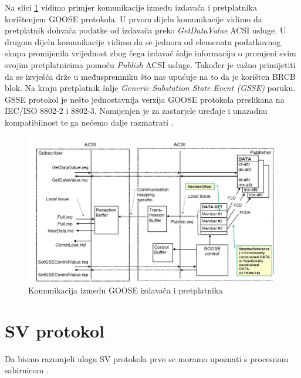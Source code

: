 \documentclass[times, utf8, zavrsni]{fer}
\begin{document}
Na slici \ref{fig:iec-goose-complex} vidimo primjer komunikacije između izdavača i pretplatnika korištenjem GOOSE protokola. U prvom dijelu komunikacije vidimo da pretplatnik dohvaća podatke od izdavača preko \textit{GetDataValue} ACSI usluge. U drugom dijelu komunikacije vidimo da se jednom od elemenata podatkovnog skupa promijenila vrijednost zbog čega izdavač šalje informaciju o promjeni svim svojim pretplatnicima pomoću \textit{Publish} ACSI usluge. Također je važno primijetiti da se izvješća drže u međuspremniku što nas upućuje na to da je korišten BRCB blok. Na kraju pretplatnik šalje \textit{Generic Substation State Event (GSSE)} poruku. GSSE protokol je nešto jednostavnija verzija GOOSE protokola preslikana na IEC/ISO 8802-2 i 8802-3. Namijenjen je za zastarjele uređaje i unazadnu kompatibilnost te ga nećemo dalje razmatrati \citep{wiki:GSSE}.

\begin{figure}[tph]
    \centering
    \includegraphics[scale=0.5]{img/IEC61850-GOOSE-complex.jpg}
    \caption{Komunikacija između GOOSE izdavača i pretplatnika\footnotemark}
    \label{fig:iec-goose-complex}
\end{figure}

\section{SV protokol}
Da bismo razumjeli ulogu SV protokola prvo se moramo upoznati s procesnom sabirnicom .
\end{document}
